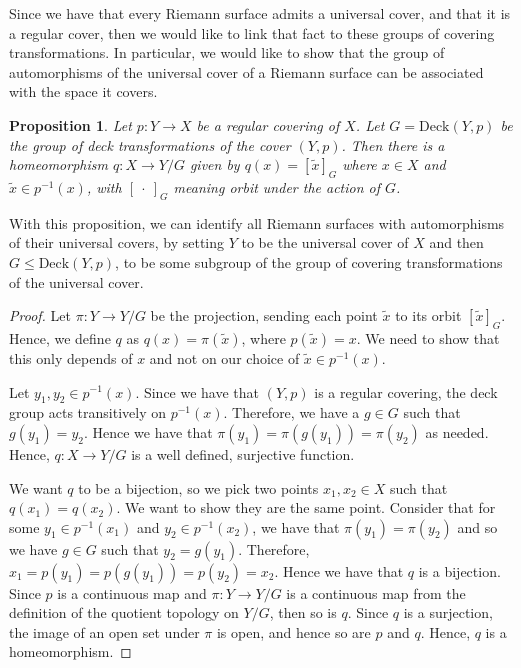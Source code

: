 \documentclass[11pt]{report}
\newtheorem{prop}[thm]{Proposition}
\theoremstyle{definition}
\begin{document}
Since we have that every Riemann surface admits a universal cover, and that it is a regular cover, then we would like to link that fact to these groups of covering transformations. In particular, we would like to show that the group of automorphisms of the universal cover of a Riemann surface can be associated with the space it covers.
\begin{prop}
  Let $p:Y \rightarrow X$ be a regular covering of $X$. Let $G = \text{Deck}(Y,p)$ be the group of deck transformations of the cover $(Y,p)$. Then there is a homeomorphism $q:X\rightarrow Y/G$ given by $q(x)=[\tilde{x}]_G$ where $x \in X$ and $\tilde{x} \in p^{-1}(x)$, with $[\: \cdot \: ]_G$ meaning orbit under the action of $G$. 
\end{prop}
With this proposition, we can identify all Riemann surfaces with automorphisms of their universal covers, by setting $Y$ to be the universal cover of $X$ and then $G \leq \text{Deck}(Y,p)$, to be some subgroup of the group of covering transformations of the universal cover.
\begin{proof}
  Let $\pi : Y \rightarrow Y/G$ be the projection, sending each point $\tilde{x}$ to its orbit $[\tilde{x}]_G$. Hence, we define $q$ as $q(x) = \pi(\tilde{x})$, where $p(\tilde{x})=x$. We need to show that this only depends of $x$ and not on our choice of $\tilde{x} \in p^{-1}(x)$. 
  
  Let $y_1,y_2 \in p^{-1}(x)$. Since we have that $(Y,p)$ is a regular covering, the deck group acts transitively on $p^{-1}(x)$. Therefore, we have a $g \in G$ such that $g(y_1) = y_2$. Hence we have that $\pi(y_1) = \pi(g(y_1))=\pi(y_2)$ as needed. Hence, $q:X \rightarrow Y/G$ is a well defined, surjective function. 
  
  We want $q$ to be a bijection, so we pick two points $x_1,x_2 \in X$ such that $q(x_1)=q(x_2)$. We want to show they are the same point. Consider that for some $y_1 \in p^{-1}(x_1)$ and $y_2 \in p^{-1}(x_2)$, we have that $\pi(y_1) = \pi(y_2)$ and so we have $g \in G$ such that $y_2 = g(y_1)$. Therefore, $x_1 = p(y_1) = p(g(y_1))=p(y_2)=x_2$. Hence we have that $q$ is a bijection. Since $p$ is a continuous map and $\pi:Y \rightarrow Y/G$ is a continuous map from the definition of the quotient topology on $Y/G$, then so is $q$. Since $q$ is a surjection, the image of an open set under $\pi$ is open, and hence so are $p$ and $q$. Hence, $q$ is a homeomorphism.
\end{proof}
\end{document}
